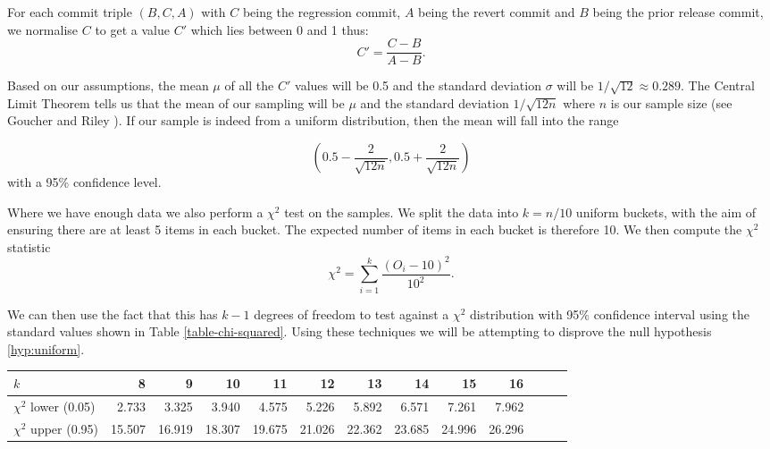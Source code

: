 \documentclass[10pt,journal,compsoc]{IEEEtran}
\begin{document}
For each commit triple $(B, C, A)$ with $C$ being the regression commit, $A$ being the revert commit and $B$ being the prior release commit, we normalise $C$ to get a value $C'$ which lies between 0 and 1 thus:
$$
C' = \frac{C - B}{A - B} .
$$

Based on our assumptions, the mean $\mu$ of all the $C'$ values will be 0.5 and the standard deviation $\sigma$ will be $1 / \sqrt{12} \approx 0.289$. The Central Limit Theorem tells us that the mean of our sampling will be $\mu$ and the standard deviation $1 / \sqrt{12 n}$ where $n$ is our sample size (see Goucher and Riley \cite{goucher2009}). If our sample is indeed from a uniform distribution, then the mean will fall into the range

$$
\left( 0.5 - \frac{2}{\sqrt{12 n}}, 0.5 + \frac{2}{\sqrt{12 n}} \right)
$$
with a 95\% confidence level.

Where we have enough data we also perform a $\chi^2$ test on the samples. We split the data into $k = n / 10$ uniform buckets, with the aim of ensuring there are at least 5 items in each bucket. The expected number of items in each bucket is therefore 10. We then compute the $\chi^2$ statistic \cite{knuth2014}
$$
\chi^2 = \sum_{i = 1}^k \frac{(O_i - 10)^2}{10^2} .
$$

We can then use the fact that this has $k - 1$ degrees of freedom to test against a $\chi^2$ distribution with 95\% confidence interval using the standard values shown in Table \ref{table-chi-squared}. Using these techniques we will be attempting to disprove the null hypothesis \ref{hyp:uniform}.

\begin{table*}[t!]
\begin{center}
\begin{tabular}{l r r r r r r r r r r r r} \hline
$k$ & 8 & 9 & 10 & 11 & 12 & 13 & 14 & 15 & 16 \\ \hline
$\chi^2$ lower (0.05) & 2.733 & 3.325 & 3.940 & 4.575 & 5.226 & 5.892 & 6.571 & 7.261 & 7.962 \\
$\chi^2$ upper (0.95) & 15.507 & 16.919 & 18.307 & 19.675 & 21.026 & 22.362 & 23.685 & 24.996 & 26.296 \\ \hline
\end{tabular}
\caption{\label{table-chi-squared}$\chi^2$ distribution values for 95\% confidence.}
\end{center}
\end{table*}
\end{document}
